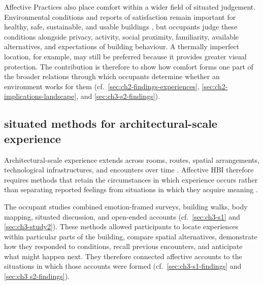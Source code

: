 Affective Practices also place comfort within a wider field of situated
judgement. Environmental conditions and reports of satisfaction remain
important for healthy, safe, sustainable, and usable buildings
\cite{alavi2017comfort,jazizadeh2014human,marques2020real,
van2010effect,zhang2012factors}, but occupants judge these conditions
alongside privacy, activity, social proximity, familiarity, available
alternatives, and expectations of building behaviour. A thermally
imperfect location, for example, may still be preferred because it
provides greater visual protection. The contribution is therefore to
show how comfort forms one part of the broader relations through which
occupants determine whether an environment works for them
(cf.~\autoref{sec:ch2-findings-experiences},
\autoref{sec:ch2-implications-landscape}, and
\autoref{sec:ch3-s2-findings}).


\subsection{situated methods for architectural-scale experience}
\label{subsec:situated-methods}

Architectural-scale experience extends across rooms, routes, spatial arrangements, technological infrastructures, and encounters over time \cite{alavi2019introduction,alavi2018artifacts, wiberg2008environment, wiberg2020interaction,becerik2022field}. Affective HBI therefore requires methods that retain the circumstances in which experience occurs rather than separating reported feelings from situations in which they acquire meaning \cite{dourish2001action,mccarthy2004technology, lottridge2011affective,ahmadpour2025affective}.

The occupant studies combined emotion-framed surveys, building walks, body mapping, situated discussion, and open-ended accounts \cite{mitchell2020no,crivellaro2015contesting, turmo2023towards,hook2018designing} (cf.~\autoref{sec:ch3-s1} and \autoref{sec:ch3-study2}). These methods allowed participants to locate experiences within particular parts of the building, compare spatial alternatives, demonstrate how they responded to conditions, recall previous encounters, and anticipate what might happen next. They therefore connected affective accounts to the situations in which those accounts were formed (cf.~\autoref{sec:ch3-s1-findings} and \autoref{sec:ch3 s2-findings}).

